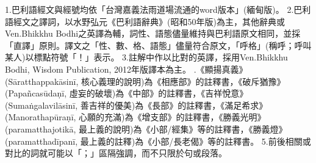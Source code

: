 1.巴利語經文與經號均依「台灣嘉義法雨道場流通的word版本」(緬甸版)。
\blank
2.巴利語經文之譯詞，以水野弘元《巴利語辭典》(昭和50年版)為主，其他辭典或Ven.Bhikkhu Bodhi之英譯為輔，詞性、語態儘量維持與巴利語原文相同，並採「直譯」原則。譯文之「性、數、格、語態」儘量符合原文，「呼格」(稱呼；呼叫某人)以標點符號「！」表示。
\blank
3.註解中作以比對的英譯，採用Ven.Bhikkhu Bodhi, Wisdom Publication, 2012年版譯本為主。
.《顯揚真義》(Sāratthappakāsinī, 核心義理的說明)為《相應部》的註釋書，《破斥猶豫》(Papañcasūdaṇī, 虛妄的破壞)為《中部》的註釋書，《吉祥悅意》(Sumaṅgalavilāsinī, 善吉祥的優美)為《長部》的註釋書，《滿足希求》(Manorathapūraṇī, 心願的充滿)為《增支部》的註釋書，《勝義光明》(paramatthajotikā, 最上義的說明)為《小部/經集》等的註釋書，《勝義燈》(paramatthadīpanī, 最上義的註釋)為《小部/長老偈》等的註釋書。
\blank
5.前後相關或對比的詞就可能以「；」區隔強調，而不只限於句或段落。